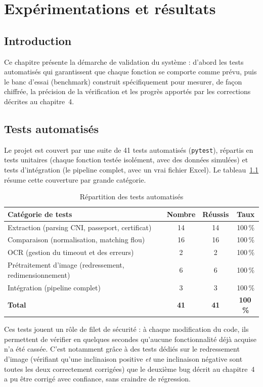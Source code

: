 \chapter{Expérimentations et résultats}
\minitoc
\newpage

\section{Introduction}

Ce chapitre présente la démarche de validation du système : d'abord les tests automatisés qui garantissent que chaque fonction se comporte comme prévu, puis le banc d'essai (benchmark) construit spécifiquement pour mesurer, de façon chiffrée, la précision de la vérification et les progrès apportés par les corrections décrites au chapitre~4.

\section{Tests automatisés}

Le projet est couvert par une suite de 41 tests automatisés (\texttt{pytest}), répartis en tests unitaires (chaque fonction testée isolément, avec des données simulées) et tests d'intégration (le pipeline complet, avec un vrai fichier Excel). Le tableau~\ref{tab:tests} résume cette couverture par grande catégorie.

\begin{table}[H]
\centering
\caption{Répartition des tests automatisés}
\label{tab:tests}
\begin{tabular}{lccc}
\toprule
Catégorie de tests & Nombre & Réussis & Taux \\
\midrule
Extraction (parsing CNI, passeport, certificat) & 14 & 14 & 100\,\% \\
Comparaison (normalisation, matching flou) & 16 & 16 & 100\,\% \\
OCR (gestion du timeout et des erreurs) & 2 & 2 & 100\,\% \\
Prétraitement d'image (redressement, redimensionnement) & 6 & 6 & 100\,\% \\
Intégration (pipeline complet) & 3 & 3 & 100\,\% \\
\midrule
\textbf{Total} & \textbf{41} & \textbf{41} & \textbf{100\,\%} \\
\bottomrule
\end{tabular}
\end{table}

Ces tests jouent un rôle de filet de sécurité : à chaque modification du code, ils permettent de vérifier en quelques secondes qu'aucune fonctionnalité déjà acquise n'a été cassée. C'est notamment grâce à des tests dédiés sur le redressement d'image (vérifiant qu'une inclinaison positive \emph{et} une inclinaison négative sont toutes les deux correctement corrigées) que le deuxième bug décrit au chapitre~4 a pu être corrigé avec confiance, sans craindre de régression.

